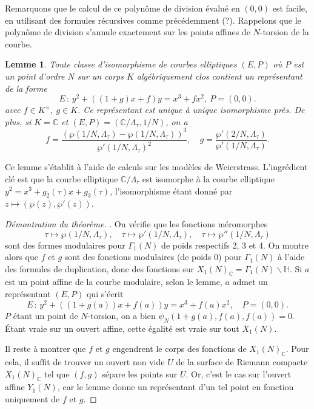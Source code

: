 \documentclass[11pt,a4paper]{article}
\newcommand{\C}{\mathbb{C}}
\renewcommand{\H}{\mathbb{H}}
\newcommand{\de}{\,:\,}
\newtheorem*{lem}{Lemme}
\theoremstyle{definition}
\begin{document}
Remarquons que le calcul de ce polynôme de division évalué en $(0, 0)$ est facile, en utilisant des formules récursives comme précédemment (?). Rappelons que le polynôme de division s'annule exactement sur les points affines de $N$-torsion de la courbe.

\begin{lem}
Toute classe d'isomorphisme de courbes elliptiques $(E, P)$ où $P$ est un point d'ordre $N$ sur un corps $K$ algébriquement clos contient un représentant de la forme
$$E\de y^2 + ((1+g) x + f)y = x^3 + fx^2,\ P = (0,0).$$
avec $f\in K^\times,\ g\in K$. Ce représentant est unique à unique isomorphisme près.
De plus, si $K=\C$ et $(E, P) = (\C/\Lambda_\tau, 1/N)$, on a
$$f = \frac{(\wp(1/N, \Lambda_\tau) - \wp(1/N, \Lambda_\tau))^3}{\wp'(1/N, \Lambda_\tau)^2}, \quad  g = \frac{\wp'(2/N, \Lambda_\tau)}{\wp'(1/N,\Lambda_\tau)}.$$
\end{lem}
Ce lemme s'établit à l'aide de calculs sur les modèles de Weierstrass. L'ingrédient clé est que la courbe elliptique $\C/\Lambda_\tau$ est isomorphe à la courbe elliptique $y^2 = x^3 + g_2(\tau) x + g_3(\tau)$, l'isomorphisme étant donné par 
$z\mapsto (\wp(z), \wp'(z))$.

\begin{proof}[Démontration du théorème]. On vérifie que les fonctions méromorphes
$$\tau\mapsto \wp(1/N, \Lambda_\tau),\quad \tau\mapsto\wp'(1/N,\Lambda_\tau),\quad \tau\mapsto\wp''(1/N, \Lambda_\tau)$$
sont des formes modulaires pour $\Gamma_1(N)$ de poids respectifs 2, 3 et 4. On montre alors que $f$ et $g$ sont des fonctions modulaires (de poids 0) pour $\Gamma_1(N)$ à l'aide des formules de duplication, donc des fonctions sur $X_1(N)_\C = \overline{\Gamma_1(N)\backslash \H}$. Si $a$ est un point affine de la courbe modulaire, selon le lemme, $a$ admet un représentant $(E, P)$ qui s'écrit
$$E\de y^2 + ((1 + g(a))x + f(a))y = x^3 + f(a)x^2,\quad P = (0, 0).$$
$P$ étant un point de $N$-torsion, on a bien $\psi_N(1+g(a), f(a), f(a)) = 0$. \'Etant vraie sur un ouvert affine, cette égalité est vraie sur tout $X_1(N)$.

Il reste à montrer que $f$ et $g$ engendrent le corps des fonctions de $X_1(N)_\C$. Pour cela, il suffit de trouver un ouvert non vide $U$ de la surface de Riemann compacte $X_1(N)_\C$ tel que $(f, g)$ sépare les points sur $U$. Or, c'est le cas sur l'ouvert affine $Y_1(N)$, car le lemme donne un représentant d'un tel point en fonction uniquement de $f$ et $g$.
\end{proof}
\end{document}
